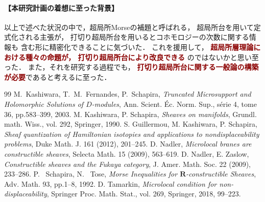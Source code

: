 \documentclass[10pt,a4paper,uplatex,dvipdfmx]{ujarticle} 		%
\newcommand{\研究課題名}{打切り超局所台の関手的性質の研究とMorse理論への応用}
\newcommand{\研究機関名}{北海道大学}
\newcommand{\研究代表者氏名}{大柴寿浩}
\begin{document}

\vspace{-16pt}
\paragraph{【本研究計画の着想に至った背景】}
以上で述べた状況の中で，超局所Morseの補題と呼ばれる，
超局所台を用いて定式化される主張が，
打切り超局所台を用いるとコホモロジーの次数に関する情報も
含む形に精密化できることに気づいた．
これを援用して，\textcolor{darkred}{
	\textbf{超局所層理論における種々の命題が，
	打切り超局所台により改良できる}
}のではないかと思い至った．
また，それを研究する過程でも，
\textcolor{darkred}{\textbf{打切り超局所台に関する一般論の構築が必要}}であると考えるに至った．

\begin{thebibliography}{99}
	{\small
	\vspace{-4pt}	
	 M.~Kashiwara, T.~M.~Fernandes, 
	P.~Schapira, 
	\textit{Truncated Microsupport and Holomorphic Solutions 
	of \(D\)-modules}, 
	Ann. Scient. \'Ec. Norm. Sup., s\'erie 4, tome 36, 
	pp.583--399, 2003.
	\vspace{-6pt}	
	 M. Kashiwara, P. Schapira, \emph{Sheaves on manifolds}, Grundl. math. Wiss., vol. 292, Springer, 1990.
	\vspace{-6pt}
	 S. Guillermou, M. Kashiwara, P. Schapira, \emph{Sheaf quantization of Hamiltonian isotopies and applications to nondisplaceability problems}, Duke Math. J. 161 (2012), 201--245.
	\vspace{-6pt}
	 D. Nadler, \emph{Microlocal branes are constructible sheaves}, Selecta Math. 15 (2009), 563--619.
	\vspace{-6pt}
	 D. Nadler, E. Zaslow, \emph{Constructible sheaves and the Fukaya category}, J. Amer. Math. Soc. 22 (2009), 233--286.
	\vspace{-6pt}
	 P.~ Schapira, N.~ Tose, 
    \textit{Morse Inequalities for \(\mathbf{R}\)-constructible Sheaves}, 
    Adv. Math. 93, pp.1--8, 1992. 
	\vspace{-10pt}
	 D. Tamarkin, \emph{Microlocal condition for non-displaceability}, Springer Proc. Math. Stat., vol. 269, Springer, 2018, 99--223.
	\vspace{-6pt}
	}
\end{thebibliography}
\end{document}
